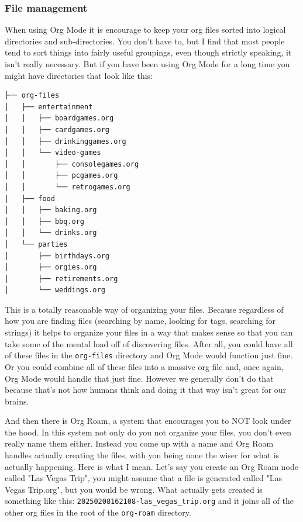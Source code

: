\documentclass[11pt]{article}
\begin{document}
\subsubsection*{File management}
\label{sec:org5b9952e}
When using Org Mode it is encourage to keep your org files sorted into logical directories and sub-directories. You don't have to, but I find that most people tend to sort things into fairly useful groupings, even though strictly speaking, it isn't really necessary. But if you have been using Org Mode for a long time you might have directories that look like this:

\begin{verbatim}
├── org-files
│   ├── entertainment
│   │   ├── boardgames.org
│   │   ├── cardgames.org
│   │   ├── drinkinggames.org
│   │   └── video-games
│   │       ├── consolegames.org
│   │       ├── pcgames.org
│   │       └── retrogames.org
│   ├── food
│   │   ├── baking.org
│   │   ├── bbq.org
│   │   └── drinks.org
│   └── parties
│       ├── birthdays.org
│       ├── orgies.org
│       ├── retirements.org
│       └── weddings.org
\end{verbatim}

This is a totally reasonable way of organizing your files. Because regardless of how you are finding files (searching by name, looking for tags, searching for strings) it helps to organize your files in a way that makes sense so that you can take some of the mental load off of discovering files. After all, you could have all of these files in the \texttt{org-files} directory and Org Mode would function just fine. Or you could combine all of these files into a massive org file and, once again, Org Mode would handle that just fine. However we generally don't do that because that's not how humans think and doing it that way isn't great for our brains.

And then there is Org Roam, a system that encourages you to NOT look under the hood. In this system not only do you not organize your files, you don't even really name them either. Instead you come up with a name and Org Roam handles actually creating the files, with you being none the wiser for what is actually happening. Here is what I mean. Let's say you create an Org Roam node called "Las Vegas Trip", you might assume that a file is generated called "Las Vegas Trip.org", but you would be wrong. What actually gets created is something like this: \texttt{20250208162108-las\_vegas\_trip.org} and it joins all of the other org files in the root of the \texttt{org-roam} directory.
\end{document}
